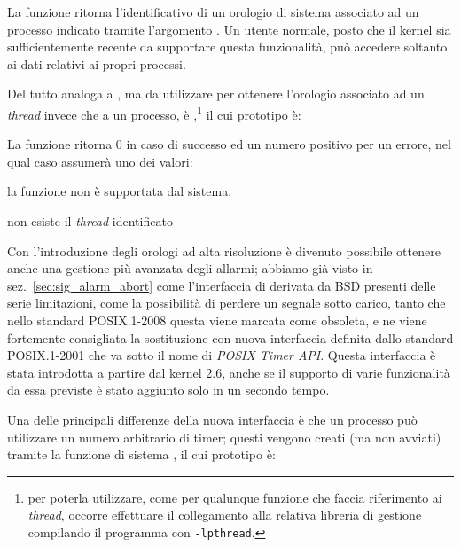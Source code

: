 La funzione ritorna l'identificativo di un orologio di sistema associato ad un
processo indicato tramite l'argomento . Un utente normale, posto
che il kernel sia sufficientemente recente da supportare questa funzionalità,
può accedere soltanto ai dati relativi ai propri processi.

Del tutto analoga a , ma da utilizzare per ottenere
l'orologio associato ad un \textit{thread} invece che a un processo, è
,\footnote{per poterla utilizzare, come per
  qualunque funzione che faccia riferimento ai \textit{thread}, occorre
  effettuare il collegamento alla relativa libreria di gestione compilando il
  programma con \texttt{-lpthread}.} il cui prototipo è:

\begin{funcproto}{
}

{La funzione ritorna $0$ in caso di successo ed un numero positivo per un
  errore, nel qual caso  assumerà uno dei valori:
  \begin{errlist}
  \item[\errcode{ENOENT}] la funzione non è supportata dal sistema.
  \item[\errcode{ESRCH}] non esiste il \textit{thread} identificato
  \end{errlist}
 }
\end{funcproto}



Con l'introduzione degli orologi ad alta risoluzione è divenuto possibile
ottenere anche una gestione più avanzata degli allarmi; abbiamo già visto in
sez.~\ref{sec:sig_alarm_abort} come l'interfaccia di  derivata
da BSD presenti delle serie limitazioni, come la possibilità di perdere un
segnale sotto carico, tanto che nello standard POSIX.1-2008 questa viene
marcata come obsoleta, e ne viene fortemente consigliata la sostituzione con
nuova interfaccia definita dallo standard POSIX.1-2001 che va sotto il nome di
\textit{POSIX Timer API}. Questa interfaccia è stata introdotta a partire dal
kernel 2.6, anche se il supporto di varie funzionalità da essa previste è
stato aggiunto solo in un secondo tempo.

Una delle principali differenze della nuova interfaccia è che un processo può
utilizzare un numero arbitrario di timer; questi vengono creati (ma non
avviati) tramite la funzione di sistema , il cui
prototipo è:

